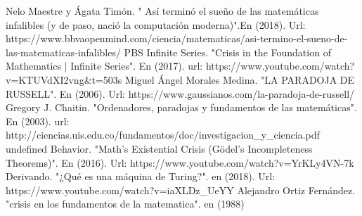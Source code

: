 \documentclass[letterpaper, 12pt]{article}
\begin{document}
\begin{thebibliography}{0}

 Nelo Maestre y Ágata Timón. " Así terminó el sueño de las matemáticas infalibles (y de paso, nació la computación moderna)".En (2018). Url: https://www.bbvaopenmind.com/ciencia/matematicas/asi-termino-el-sueno-de-las-matematicas-infalibles/
 PBS Infinite Series. "Crisis in the Foundation of Mathematics | Infinite Series". En (2017). url: https://www.youtube.com/watch?v=KTUVdXI2vng&t=503s
 Miguel Ángel Morales Medina. "LA PARADOJA DE RUSSELL". En (2006). Url:
https://www.gaussianos.com/la-paradoja-de-russell/
 Gregory J. Chaitin. "Ordenadores, paradojas y fundamentos de las matemáticas". En (2003). url: http://ciencias.uis.edu.co/fundamentos/doc/investigacion\_y\_ciencia.pdf
 undefined Behavior. "Math's Existential Crisis (Gödel's Incompleteness Theorems)". En (2016). Url: https://www.youtube.com/watch?v=YrKLy4VN-7k
 Derivando. "¿Qué es una máquina de Turing?". en (2018). Url: https://www.youtube.com/watch?v=iaXLDz\_UeYY
 Alejandro Ortiz Fernández. "crisis en los fundamentos de la matematica". en (1988)


\end{thebibliography}
\end{document}

